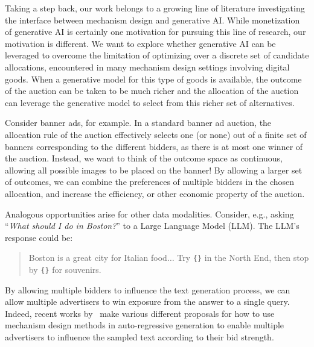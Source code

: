 \documentclass[format=acmsmall, review=false]{acmart}
\begin{document}

Taking a step back, our work belongs to a growing line of literature investigating the interface between mechanism design and generative AI. While monetization of generative AI is certainly one motivation for pursuing this line of research, our motivation is different. We want to explore whether generative AI can be leveraged to overcome the limitation of optimizing over a discrete set of candidate allocations, encountered in many mechanism design settings involving digital goods. When a  generative model for this type of goods is available, the outcome of the auction can be taken to be much richer and the allocation of the auction can leverage the generative model to select from this richer set of alternatives. 

Consider banner ads, for example. In a standard banner ad auction, the allocation rule of the auction effectively selects one (or none) out of a finite set of banners corresponding to the different bidders, as there is at most one winner of the auction. Instead, we want to think of the outcome space as continuous, allowing all possible images to be placed on the banner! By allowing a larger set of outcomes, we can combine the preferences of multiple bidders in the chosen allocation, and increase the efficiency, or other economic property of the auction.

Analogous opportunities arise for other data modalities.
Consider, e.g., asking ``\emph{What should I do in Boston?}'' to a Large Language Model (LLM). The LLM's response could be:
\begin{quote}
\small
Boston is a great city for Italian food$\dots$ Try \texttt{\{<Italian Restaurant Ad 1>\}} in the North End, then stop by \texttt{\{<Local Shop Ad 2>\}} for souvenirs.
\end{quote}
By allowing multiple bidders to influence the text generation process, we can allow multiple advertisers to win exposure from the answer to a single query. Indeed, recent works by~\citet{duetting2024mechanismdesignlargelanguage,hajiaghayi2024adauctionsllmsretrieval,feizi2024onlineadvertisementsllmsopportunities,dubey2024auctionsllmsummaries} make various different proposals for how to use mechanism design methods in auto-regressive generation to enable multiple advertisers to influence the sampled text according to their bid strength.
\end{document}
